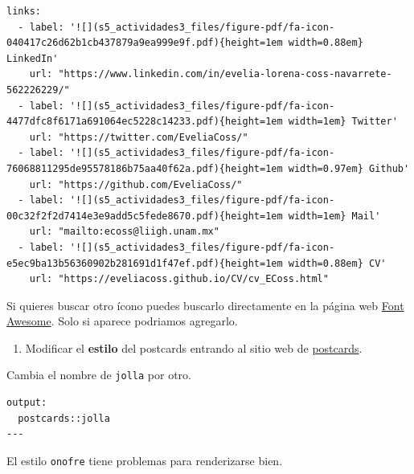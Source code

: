 \documentclass[
  spanish,
  12pt,
  letterpaper,
  DIV=11,
  numbers=noendperiod]{scrreprt}
\providecommand{\tightlist}{%
  \setlength{\itemsep}{0pt}\setlength{\parskip}{0pt}}
\begin{document}
\begin{verbatim}
links:
  - label: '![](s5_actividades3_files/figure-pdf/fa-icon-040417c26d62b1cb437879a9ea999e9f.pdf){height=1em width=0.88em} LinkedIn'
    url: "https://www.linkedin.com/in/evelia-lorena-coss-navarrete-562226229/"
  - label: '![](s5_actividades3_files/figure-pdf/fa-icon-4477dfc8f6171a691064ec5228c14233.pdf){height=1em width=1em} Twitter'
    url: "https://twitter.com/EveliaCoss/"
  - label: '![](s5_actividades3_files/figure-pdf/fa-icon-76068811295de95578186b75aa40f62a.pdf){height=1em width=0.97em} Github'
    url: "https://github.com/EveliaCoss/"
  - label: '![](s5_actividades3_files/figure-pdf/fa-icon-00c32f2f2d7414e3e9add5c5fede8670.pdf){height=1em width=1em} Mail'
    url: "mailto:ecoss@liigh.unam.mx"
  - label: '![](s5_actividades3_files/figure-pdf/fa-icon-e5ec9ba13b56360902b281691d1f47ef.pdf){height=1em width=0.88em} CV'
    url: "https://eveliacoss.github.io/CV/cv_ECoss.html"
\end{verbatim}

\begin{tcolorbox}[enhanced jigsaw, arc=.35mm, bottomrule=.15mm, bottomtitle=1mm, breakable, colback=white, colbacktitle=quarto-callout-note-color!10!white, colframe=quarto-callout-note-color-frame, coltitle=black, left=2mm, leftrule=.75mm, opacityback=0, opacitybacktitle=0.6, rightrule=.15mm, title=\textcolor{quarto-callout-note-color}{\faInfo}\hspace{0.5em}{Nota}, titlerule=0mm, toprule=.15mm, toptitle=1mm]

Si quieres buscar otro ícono puedes buscarlo directamente en la página
web \href{https://fontawesome.com/}{Font Awesome}. Solo si aparece
podriamos agregarlo.

\end{tcolorbox}

\begin{enumerate}
\def\labelenumi{\arabic{enumi}.}
\setcounter{enumi}{2}
\tightlist
\item
  Modificar el \textbf{estilo} del postcards entrando al sitio web de
  \href{https://github.com/seankross/postcards}{postcards}.
\end{enumerate}

Cambia el nombre de \texttt{jolla} por otro.

\begin{verbatim}
output:
  postcards::jolla
---  
\end{verbatim}

\begin{tcolorbox}[enhanced jigsaw, arc=.35mm, bottomrule=.15mm, bottomtitle=1mm, breakable, colback=white, colbacktitle=quarto-callout-caution-color!10!white, colframe=quarto-callout-caution-color-frame, coltitle=black, left=2mm, leftrule=.75mm, opacityback=0, opacitybacktitle=0.6, rightrule=.15mm, title=\textcolor{quarto-callout-caution-color}{\faFire}\hspace{0.5em}{Precaución}, titlerule=0mm, toprule=.15mm, toptitle=1mm]

El estilo \texttt{onofre} tiene problemas para renderizarse bien.

\end{tcolorbox}
\end{document}

